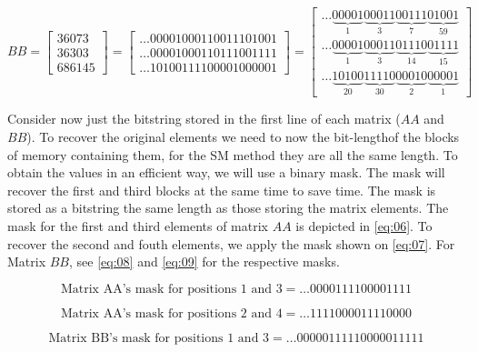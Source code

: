 \documentclass[12pt]{article}
\begin{document}
\begin{equation}\label{eq:02}
	BB = \begin{bmatrix}
			36073\\ 
			36303\\ 
			686145
		\end{bmatrix}
        =
         \begin{bmatrix}
			\ldots00001000110011101001\\ 
			\ldots00001000110111001111\\ 
			\ldots10100111100001000001
		\end{bmatrix}
        =
        \begin{bmatrix}

\ldots\underbrace{00001}_{1}\underbrace{00011}_{3}\underbrace{00111}_{7}
\underbrace{01001}_{59}\\
\ldots\underbrace{00001}_{1}\underbrace{00011}_{3}\underbrace{01110}_{14}
\underbrace{01111}_{15}\\
\ldots\underbrace{10100}_{20}\underbrace{11110}_{30}\underbrace{00010}_{2}
\underbrace{00001}_{1}
		\end{bmatrix}
\end{equation}

Consider now just the bitstring stored in the first line of each matrix ($AA$
and $BB$). To recover the original elements we need to now the bit-lengthof
the blocks of memory containing them, for the SM method they are all the same
length. To obtain the values in an efficient way, we will use a binary mask.
The mask will recover the first and third blocks at the same time to save time.
The mask is stored as a bitstring the same length as those storing the matrix
elements. The mask for the first and third elements of matrix $AA$ is depicted
in \ref{eq:06}. To recover the second and fouth elements, we apply the mask
shown on \ref{eq:07}. For Matrix $BB$, see \ref{eq:08} and \ref{eq:09} for the
respective masks.



\begin{equation}\label{eq:06}
\text{Matrix AA's mask for positions 1 and 3} = \ldots0000111100001111
\end{equation}

\begin{equation}\label{eq:07}
\text{Matrix AA's mask for positions 2 and 4} = \ldots1111000011110000
\end{equation}

\begin{equation}\label{eq:08}
\text{Matrix BB's mask for positions 1 and 3} = \ldots00000111110000011111
\end{equation}
\end{document}
